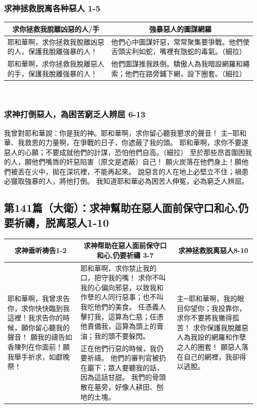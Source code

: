 \subsubsection{求神拯救脱离各种惡人 1-5}
\begin{table}[H]
\centering
\begin{tabular}{p{}|p{9.00cm}}\hline\hline
\multicolumn{1}{c|}{求你拯救我脫離凶惡的人/手}&\multicolumn{1}{c}{強暴惡人的圖謀網羅}\\\hline
耶和華啊，求你拯救我脫離凶惡的人，保護我脫離強暴的人！
&他們心中圖謀奸惡，常常聚集要爭戰。他們使舌頭尖利如蛇，嘴裡有虺蛇的毒氣。（細拉）\\\hline
耶和華啊，求你拯救我脫離惡人的手，保護我脫離強暴的人！
&他們圖謀推我跌倒。驕傲人為我暗設網羅和繩索；他們在路旁鋪下網，設下圈套。（細拉）\\\hline
\end{tabular}
\end{table} 

\subsubsection{求神打倒惡人，為困苦窮乏人辨屈 6-13}
我曾對耶和華說：你是我的神。耶和華啊，求你留心聽我懇求的聲音！
主─耶和華、我救恩的力量啊，在爭戰的日子，你遮蔽了我的頭。
耶和華啊，求你不要遂惡人的心願；不要成就他們的計謀，恐怕他們自高。（細拉）
至於那些昂首圍困我的人，願他們嘴唇的奸惡陷害（原文是遮蔽）自己！
願火炭落在他們身上！願他們被丟在火中，拋在深坑裡，不能再起來。
說惡言的人在地上必堅立不住；禍患必獵取強暴的人，將他打倒。
我知道耶和華必為困苦人伸冤，必為窮乏人辨屈。


\subsection{第141篇（大衛）：求神幫助在惡人面前保守口和心,仍要祈禱，脱离惡人1-10}
\begin{table}[H]
\centering
\begin{tabular}{p{3.5cm}|p{9.500cm}|p{}}\hline\hline
\multicolumn{1}{c|}{求神垂听祷告1-2}&\multicolumn{1}{c|}{求神帮助在惡人面前保守口和心,仍要祈禱 3-7}&\multicolumn{1}{c}{求神拯救脱离惡人8-10}\\\hline

\multirow{2}{3.7cm}{耶和華啊，我曾求告你，求你快快臨到我這裡！我求告你的時候，願你留心聽我的聲音！
願我的禱告如香陳列在你面前！願我舉手祈求，如獻晚祭！}
&耶和華啊，求你禁止我的口，把守我的嘴！
求你不叫我的心偏向邪惡，以致我和作孽的人同行惡事；也不叫我吃他們的美食。
任憑義人擊打我，這算為仁慈；任憑他責備我，這算為頭上的膏油；我的頭不要躲閃。
&\multirow{2}{4.2cm}{主─耶和華啊，我的眼目仰望你；我投靠你，求你不要將我撇得孤苦！
求你保護我脫離惡人為我設的網羅和作孽之人的圈套！
願惡人落在自己的網裡，我卻得以逃脫。}\\\cline{2-2}

&正在他們行惡的時候，我仍要祈禱。
他們的審判官被扔在巖下；眾人要聽我的話，因為這話甘甜。
我們的骨頭散在墓旁，好像人耕田、刨地的土塊。&\\\hline
\end{tabular}
\end{table} 


